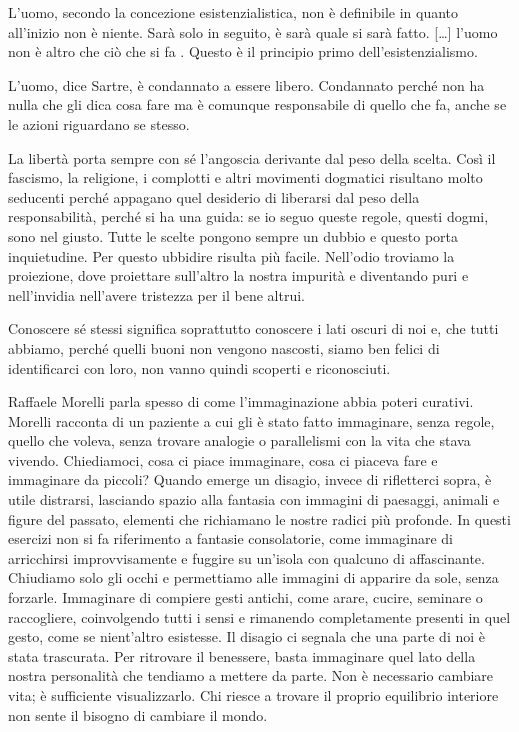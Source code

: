 \documentclass[12pt]{book} %
\begin{document}
L'uomo, secondo la concezione esistenzialistica, non è definibile in quanto all'inizio non è niente. Sarà solo in
seguito, è sarà quale si sarà fatto. […] l'uomo non è altro che ciò che si fa . Questo è il principio primo
dell'esistenzialismo.

L'uomo, dice Sartre, è condannato a essere libero. Condannato perché non ha nulla che gli dica cosa fare ma è comunque
responsabile di quello che fa, anche se le azioni riguardano se stesso.

La libertà porta sempre con sé l'angoscia derivante dal peso della scelta. Così il fascismo, la religione, i complotti e
altri movimenti dogmatici risultano molto seducenti perché appagano quel desiderio di liberarsi dal peso della
responsabilità, perché si ha una guida: se io seguo queste regole, questi dogmi, sono nel giusto. Tutte le scelte
pongono sempre un dubbio e questo porta inquietudine. Per questo ubbidire risulta più facile. Nell'odio troviamo la
proiezione, dove proiettare sull'altro la nostra impurità e diventando puri e nell'invidia
nell'avere tristezza per il bene altrui.

Conoscere sé stessi significa soprattutto conoscere i lati oscuri di noi e, che tutti abbiamo, perché quelli buoni non
vengono nascosti, siamo ben felici di identificarci con loro, non vanno quindi scoperti e riconosciuti.

Raffaele Morelli parla spesso di come l'immaginazione abbia poteri curativi. Morelli racconta di un
paziente a cui gli è stato fatto immaginare, senza regole, quello che voleva, senza trovare analogie o parallelismi con
la vita che stava vivendo. Chiediamoci, cosa ci piace immaginare, cosa ci piaceva fare e immaginare da piccoli?
Quando emerge un disagio, invece di rifletterci sopra, è utile distrarsi, lasciando spazio alla fantasia con immagini di paesaggi, animali e figure del passato, elementi che richiamano le nostre radici più profonde. In questi esercizi non si fa riferimento a fantasie consolatorie, come immaginare di arricchirsi improvvisamente e fuggire su un’isola con qualcuno di affascinante. Chiudiamo solo gli occhi e permettiamo alle immagini di apparire da sole, senza forzarle. Immaginare di compiere gesti antichi, come arare, cucire, seminare o raccogliere, coinvolgendo tutti i sensi e rimanendo completamente presenti in quel gesto, come se nient’altro esistesse.
Il disagio ci segnala che una parte di noi è stata trascurata. Per ritrovare il benessere, basta immaginare quel lato della nostra personalità che tendiamo a mettere da parte. Non è necessario cambiare vita; è sufficiente visualizzarlo. Chi riesce a trovare il proprio equilibrio interiore non sente il bisogno di cambiare il mondo.
\end{document}
